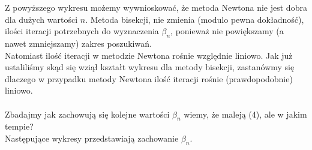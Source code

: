 \documentclass{article}
\begin{document}
Z powyższego wykresu możemy wywnioskować, że metoda Newtona nie jest dobra dla dużych wartości $n$. Metoda bisekcji, nie zmienia (modulo pewna dokładność), ilości iteracji potrzebnych do wyznaczenia $\beta_n$, ponieważ nie powiększamy (a nawet zmniejszamy) zakres poszukiwań.\\
Natomiast ilość iteracji w metodzie Newtona rośnie względnie liniowo. Jak już ustaliliśmy skąd się wziął kształt wykresu dla metody bisekcji, zastanówmy się dlaczego w przypadku metody Newtona ilość iteracji rośnie (prawdopodobnie) liniowo.\\\\
Zbadajmy jak zachowują się kolejne wartości $\beta_n$ wiemy, że maleją (4), ale w jakim tempie?\\
Następujące wykresy przedstawiają zachowanie $\beta_n$.
\begin{figure}[b!]
  \centering
  \hfill
\end{figure}

\end{document}
